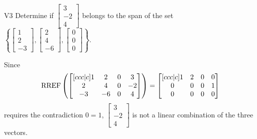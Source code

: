 \begin{problem}{V3}
  Determine if
  \(\begin{bmatrix} 3 \\ -2 \\ 4 \end{bmatrix}\)
  belongs to the span of the set
  \(\left\{
    \begin{bmatrix} 1 \\ 2 \\ -3 \end{bmatrix},
    \begin{bmatrix} 2 \\ 4 \\ -6 \end{bmatrix},
    \begin{bmatrix} 0 \\ 0 \\ 0 \end{bmatrix}
    \right\}
  \).
\end{problem}
\begin{solution}
  Since
  \[
    \operatorname{RREF}\left(
      \begin{bmatrix}[ccc|c]
        1 & 2 & 0 & 3 \\
        2 & 4 & 0 & -2 \\
        -3 & -6 & 0 & 4
      \end{bmatrix}
    \right) =
    \begin{bmatrix}[ccc|c]
      1 & 2 & 0 & 0 \\
      0 & 0 & 0 & 1 \\
      0 & 0 & 0 & 0
    \end{bmatrix}
  \]
  requires the contradiction \(0=1\),
  \(\begin{bmatrix} 3 \\ -2 \\ 4 \end{bmatrix}\) is
  not a linear combination of the three vectors.
\end{solution}
